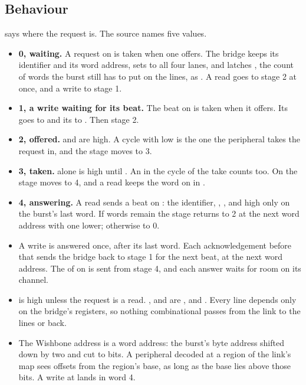 
\subsection*{Behaviour}

 says where the request is. The source names five values.

\begin{itemize}
\item \textbf{0, waiting.} A request on  is taken when one
offers. The bridge keeps its identifier and its word address, sets
 to all four lanes, and latches , the count of
words the burst still has to put on the lines, as . A
read goes to stage 2 at once, and a write to stage 1.
\item \textbf{1, a write waiting for its beat.} The beat on 
is taken when it offers. Its  goes to  and its
 to . Then stage 2.
\item \textbf{2, offered.}  and  are high. A cycle
with  low is the one the peripheral takes the request in,
and the stage moves to 3.
\item \textbf{3, taken.}  alone is high until .
An  in the cycle of the take counts too. On  the
stage moves to 4, and a read keeps the word on  in
.
\item \textbf{4, answering.} A read sends a beat on : the
identifier, , , and  high only on
the burst's last word. If words remain the stage returns to 2 at the
next word address with  one lower; otherwise to 0.
\item A write is answered once, after its last word. Each
acknowledgement before that sends the bridge back to stage 1 for the
next beat, at the next word address. The  of 
on  is sent from stage 4, and each answer waits for room on
its channel.
\item {} is high unless the request is a read. ,
 and  are ,  and .
Every line depends only on the bridge's registers, so nothing
combinational passes from the link to the lines or back.
\item The Wishbone address is a word address: the burst's byte address
shifted down by two and cut to  bits. A peripheral decoded at
a region of the link's map sees offsets from the region's base, as
long as the base lies above those bits. A write at
 lands in word 4.
\end{itemize}

